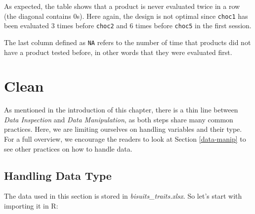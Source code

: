 \documentclass[
]{krantz}
\renewenvironment{quote}{\begin{VF}}{\end{VF}}
\begin{document}
As expected, the table shows that a product is never evaluated twice in a row (the diagonal contains 0s). Here again, the design is not optimal since \texttt{choc1} has been evaluated 3 times before \texttt{choc2} and 6 times before \texttt{choc5} in the first session.

\begin{quote}
The last column defined as \texttt{NA} refers to the number of time that products did not have a product tested before, in other words that they were evaluated first.
\end{quote}

\hypertarget{clean}{%
\section{Clean}\label{clean}}

As mentioned in the introduction of this chapter, there is a thin line between \emph{Data Inspection} and \emph{Data Manipulation}, as both steps share many common practices. Here, we are limiting ourselves on handling variables and their type. For a full overview, we encourage the readers to look at Section \ref{data-manip} to see other practices on how to handle data.

\hypertarget{handling-data-type}{%
\subsection{Handling Data Type}\label{handling-data-type}}

The data used in this section is stored in \emph{bisuits\_traits.xlsx}. So let's start with importing it in R:
\end{document}
